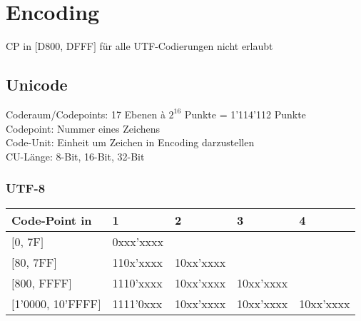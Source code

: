 \section{Encoding}
CP in $[$D800, DFFF$]$ für alle UTF-Codierungen nicht erlaubt

\subsection{Unicode}
Coderaum/Codepoints: 17 Ebenen à $2^{16}$ Punkte = 1'114'112 Punkte\\
Codepoint: Nummer eines Zeichens\\
Code-Unit: Einheit um Zeichen in Encoding darzustellen\\
CU-Länge: 8-Bit, 16-Bit, 32-Bit


\subsubsection{UTF-8}
\setlength{\tabcolsep}{0.1em}
\begin{tabular}{lllll}
  Code-Point in & 1 & 2 & 3 & 4 \\
  \hline
  $[$0, 7F$]$ & 0xxx'xxxx & & & \\
  $[$80, 7FF$]$ & 110x'xxxx & 10xx'xxxx & & \\
  $[$800, FFFF$]$ & 1110'xxxx & 10xx'xxxx & 10xx'xxxx & \\
  $[$1'0000, 10'FFFF$]$ & 1111'0xxx & 10xx'xxxx & 10xx'xxxx & 10xx'xxxx \\
\end{tabular}\\

